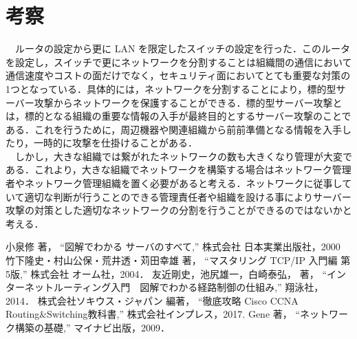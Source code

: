 \documentclass[a4j,titlepage]{jarticle}
\begin{document}
\section{考察}
　ルータの設定から更に LAN を限定したスイッチの設定を行った．このルータを設定し，スイッチで更にネットワークを分割することは組織間の通信において通信速度やコストの面だけでなく，セキュリティ面においてとても重要な対策の1つとなっている．具体的には，ネットワークを分割することにより，標的型サーバー攻撃からネットワークを保護することができる．標的型サーバー攻撃とは，標的となる組織の重要な情報の入手が最終目的とするサーバー攻撃のことである．これを行うために，周辺機器や関連組織から前前準備となる情報を入手したり，一時的に攻撃を仕掛けることがある．\\
　しかし，大きな組織では繋がれたネットワークの数も大きくなり管理が大変である．これより，大きな組織でネットワークを構築する場合はネットワーク管理者やネットワーク管理組織を置く必要があると考える．ネットワークに従事していて適切な判断が行うことのできる管理責任者や組織を設ける事によりサーバー攻撃の対策とした適切なネットワークの分割を行うことができるのではないかと考える．

\begin{thebibliography}{9}
    小泉修 著，
    ``図解でわかる サーバのすべて,''
    株式会社 日本実業出版社，2000  
    竹下隆史・村山公保・荒井透・苅田幸雄 著，
    ``マスタリング TCP/IP 入門編 第5版,''
    株式会社 オーム社，2004．
    友近剛史，池尻雄一，白崎泰弘， 著，
    ``インターネットルーティング入門　図解でわかる経路制御の仕組み,''
    翔泳社，2014．
    株式会社ソキウス・ジャパン 編著，
    ``徹底攻略 Cisco CCNA Routing&Switching教科書,''
    株式会社インプレス，2017.
    Gene 著，
    ``ネットワーク構築の基礎,''
    マイナビ出版，2009．
\end{thebibliography}
\end{document}
